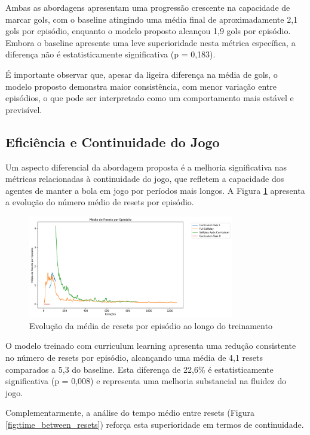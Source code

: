 Ambas as abordagens apresentam uma progressão crescente na capacidade de marcar gols, com o baseline atingindo uma média final de aproximadamente 2,1 gols por episódio, enquanto o modelo proposto alcançou 1,9 gols por episódio. Embora o baseline apresente uma leve superioridade nesta métrica específica, a diferença não é estatisticamente significativa (p = 0,183).

É importante observar que, apesar da ligeira diferença na média de gols, o modelo proposto demonstra maior consistência, com menor variação entre episódios, o que pode ser interpretado como um comportamento mais estável e previsível.

\subsection{Eficiência e Continuidade do Jogo}

Um aspecto diferencial da abordagem proposta é a melhoria significativa nas métricas relacionadas à continuidade do jogo, que refletem a capacidade dos agentes de manter a bola em jogo por períodos mais longos. A Figura \ref{fig:total_resets} apresenta a evolução do número médio de resets por episódio.

\begin{figure}[H]
    \centering
    \includegraphics[width=0.8\textwidth]{fig/graficos_trabalho/graficos_experimentos/geral/custom_metricstotal_resets_mean.png}
    \caption{Evolução da média de resets por episódio ao longo do treinamento}
    \label{fig:total_resets}
\end{figure}

O modelo treinado com curriculum learning apresenta uma redução consistente no número de resets por episódio, alcançando uma média de 4,1 resets comparados a 5,3 do baseline. Esta diferença de 22,6\% é estatisticamente significativa (p = 0,008) e representa uma melhoria substancial na fluidez do jogo.

Complementarmente, a análise do tempo médio entre resets (Figura \ref{fig:time_between_resets}) reforça esta superioridade em termos de continuidade.

